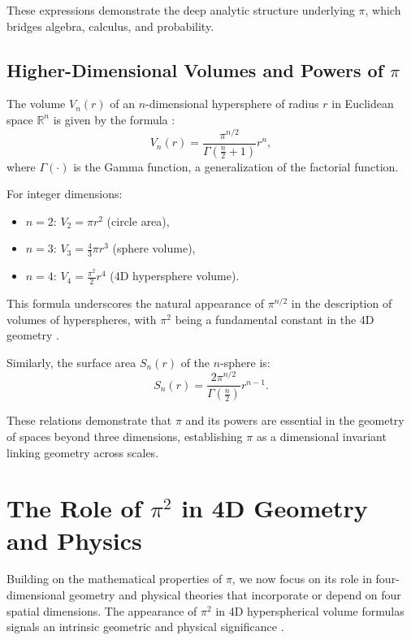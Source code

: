 \documentclass[12pt,a4paper]{article}
\begin{document}
These expressions demonstrate the deep analytic structure underlying \(\pi\), which bridges algebra, calculus, and probability.

\subsection{Higher-Dimensional Volumes and Powers of \(\pi\)}

The volume \(V_n(r)\) of an \(n\)-dimensional hypersphere of radius \(r\) in Euclidean space \(\mathbb{R}^n\) is given by the formula \cite{hypersphere-volume-formula}:
\begin{equation}
V_n(r) = \frac{\pi^{n/2}}{\Gamma\left(\frac{n}{2} + 1\right)} r^{n},
\end{equation}
where \(\Gamma(\cdot)\) is the Gamma function, a generalization of the factorial function.

For integer dimensions:
\begin{itemize}
\item \(n=2\): \(V_2 = \pi r^2\) (circle area),
\item \(n=3\): \(V_3 = \frac{4}{3}\pi r^3\) (sphere volume),
\item \(n=4\): \(V_4 = \frac{\pi^{2}}{2} r^{4}\) (4D hypersphere volume).
\end{itemize}

This formula underscores the natural appearance of \(\pi^{n/2}\) in the description of volumes of hyperspheres, with \(\pi^{2}\) being a fundamental constant in the 4D geometry \cite{pi2-4d-volume}.

Similarly, the surface area \(S_n(r)\) of the \(n\)-sphere is:
\begin{equation}
S_n(r) = \frac{2 \pi^{n/2}}{\Gamma\left(\frac{n}{2}\right)} r^{n-1}.
\end{equation}

These relations demonstrate that \(\pi\) and its powers are essential in the geometry of spaces beyond three dimensions, establishing \(\pi\) as a dimensional invariant linking geometry across scales.

\section{The Role of \(\pi^{2}\) in 4D Geometry and Physics}

Building on the mathematical properties of \(\pi\), we now focus on its role in four-dimensional geometry and physical theories that incorporate or depend on four spatial dimensions. The appearance of \(\pi^{2}\) in 4D hyperspherical volume formulas signals an intrinsic geometric and physical significance \cite{pi2-4d-physics}.
\end{document}
